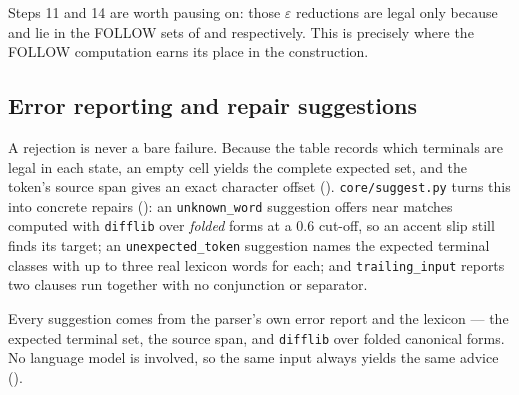 Steps 11 and 14 are worth pausing on: those $\varepsilon$ reductions are legal only because
 and  lie in the FOLLOW sets of  and 
respectively. This is precisely where the FOLLOW computation earns its place in the
construction.

\subsection{Error reporting and repair suggestions}

A rejection is never a bare failure. Because the table records which terminals are legal in
each state, an empty cell yields the complete expected set, and the token's source span
gives an exact character offset (). \texttt{core/suggest.py} turns this into
concrete repairs (): an \texttt{unknown\_word} suggestion offers near matches
computed with \texttt{difflib} over \emph{folded} forms at a 0.6 cut-off, so an accent slip
still finds its target; an \texttt{unexpected\_token} suggestion names the expected terminal
classes with up to three real lexicon words for each; and \texttt{trailing\_input} reports
two clauses run together with no conjunction or separator.

\begin{keypoint}
Every suggestion comes from the parser's own error report and the lexicon --- the expected
terminal set, the source span, and \texttt{difflib} over folded canonical forms. No language
model is involved, so the same input always yields the same advice ().
\end{keypoint}
